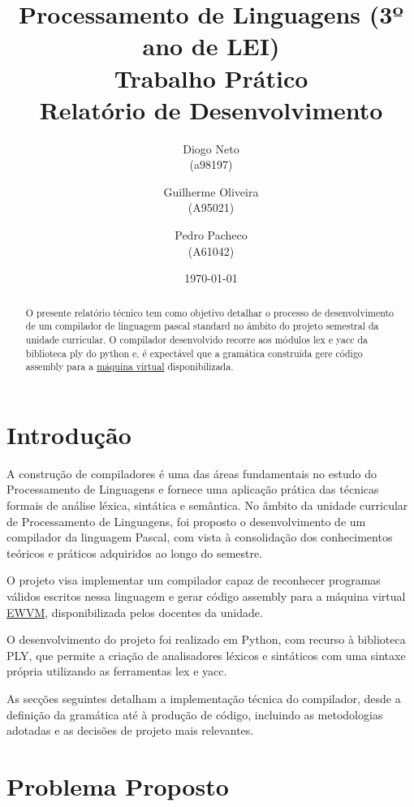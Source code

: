\documentclass[12pt,a4paper]{report}%
\title{Processamento de Linguagens (3º ano de LEI)\\
       \textbf{Trabalho Prático}\\ Relatório de Desenvolvimento
       } %
\author{Diogo Neto\\ (a98197) \and Guilherme Oliveira\\ (A95021)
         \and Pedro Pacheco\\ (A61042)
       } %
\date{\today} %
\begin{document}
\maketitle %

\begin{abstract}  %
O presente relatório técnico tem como objetivo detalhar o processo de desenvolvimento de um compilador de linguagem pascal standard no âmbito do projeto semestral da unidade curricular.
O compilador desenvolvido recorre aos módulos lex e yacc da biblioteca ply do python e, é expectável que a gramática construída gere código assembly para a  \href{https://ewvm.epl.di.uminho.pt}{máquina virtual} disponibilizada.
\end{abstract}

\tableofcontents %

\chapter{Introdução} \label{chap:intro} %

A construção de compiladores é uma das áreas fundamentais no estudo do Processamento de Linguagens e fornece uma aplicação prática das técnicas formais de análise léxica, sintática e semântica. 
No âmbito da unidade curricular de Processamento de Linguagens, foi proposto o desenvolvimento de um compilador da linguagem Pascal, com vista à consolidação dos conhecimentos teóricos e práticos adquiridos ao longo do semestre.

O projeto visa implementar um compilador capaz de reconhecer programas válidos escritos nessa linguagem e gerar código assembly para a máquina virtual \href{https://ewvm.epl.di.uminho.pt}{EWVM}, disponibilizada pelos docentes da unidade.

O desenvolvimento do projeto foi realizado em Python, com recurso à biblioteca PLY, que permite a criação de analisadores léxicos e sintáticos com uma sintaxe própria utilizando as ferramentas lex e yacc. 

As secções seguintes detalham a implementação técnica do compilador, desde a definição da gramática até à produção de código, incluindo as metodologias adotadas e as decisões de projeto mais relevantes.



\chapter{Problema Proposto}
\end{document}
